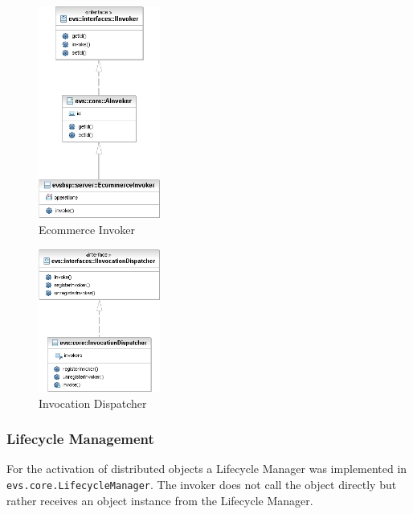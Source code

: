 \begin{figure}[ht!]
	\centering\includegraphics[width=4cm]{uml/EcommerceInvoker.jpg} 
	\caption{Ecommerce Invoker}
	\label{fig:invoker}
\end{figure}

\begin{figure}[ht!]
	\centering\includegraphics[width=4cm]{uml/InvocationDispatcher.jpg} 
	\caption{Invocation Dispatcher}
	\label{fig:dispatcher}
\end{figure}

\subsubsection{Lifecycle Management}
For the activation of distributed objects a Lifecycle Manager was implemented in \texttt{evs.core.LifecycleManager}. The invoker does not call the object directly but rather receives an object instance from the Lifecycle Manager. 

